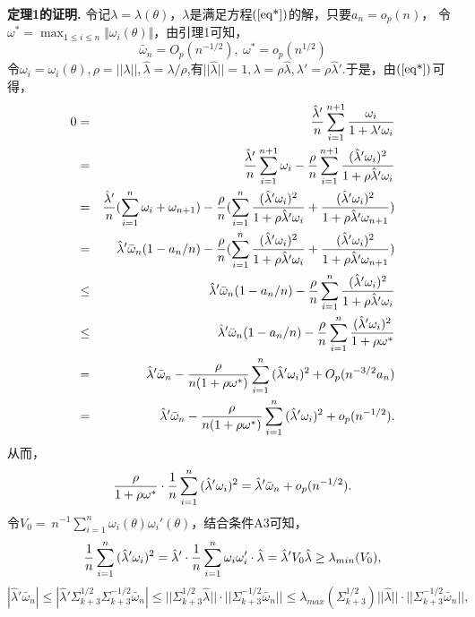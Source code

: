 \documentclass[onecolumn]{ctexart}	%
\begin{document}
{\bf 定理1的证明. }令记$\lambda=\lambda(\theta)$，$\lambda$是满足方程$(\ref{eq*})$的解，只要\( a_n=o_p(n)\)，
令\( \omega^* = \max_{ 1\leq i\leq n} \Vert  \omega_i(\theta) \Vert  \)，由引理1可知，
\[  \bar{\omega}_{n}=O_p(n^{-1/2}),\   \omega^* =o_p(n^{1/2})\]
令$\omega_i=\omega_i(\theta),\rho=||\lambda||,\hat{\lambda}=\lambda/\rho$,有$||\hat{\lambda}||=1,\lambda=\rho\hat{\lambda},\lambda'=\rho\hat{\lambda}'$.于是，由$\rm(\ref{eq*}) $可得，
\begin{eqnarray*}
0 &=&{\hat{\lambda}'\over n}\sum^{n+1}_{i=1}{\omega_i \over 1+\lambda'\omega_i}\\
&=&{\hat{\lambda}'\over n}\sum^{n+1}_{i=1}{\omega_i}-{\rho\over n}\sum^{n+1}_{i=1}{(\hat{\lambda}'\omega_i)^2 \over 1+\rho\hat{\lambda}'\omega_i} \\
&=&{\hat{\lambda}'\over n}(\sum^{n}_{i=1}{\omega_i}+\omega_{n+1})-{\rho\over n}(\sum^{n}_{i=1}{(\hat{\lambda}'\omega_i)^2 \over 1+\rho\hat{\lambda}'\omega_i}+{(\hat{\lambda}'\omega_i)^2 \over 1+\rho\hat{\lambda}'\omega_{n+1}})\\
&=&\hat{\lambda}'\bar{\omega}_n(1-a_n/n)-{\rho\over n}(\sum^{n}_{i=1}{(\hat{\lambda}'\omega_i)^2 \over 1+\rho\hat{\lambda}'\omega_i}+{(\hat{\lambda}'\omega_i)^2 \over 1+\rho\hat{\lambda}'\omega_{n+1}})\\
&\le& \hat{\lambda}'\bar{\omega}_n(1-a_n/n)-{\rho\over n}\sum^{n}_{i=1}{(\hat{\lambda}'\omega_i)^2 \over 1+\rho\hat{\lambda}'\omega_i}\\
&\le& \hat{\lambda}'\bar{\omega}_n(1-a_n/n)-{\rho\over n}\sum^{n}_{i=1}{(\hat{\lambda}'\omega_i)^2 \over 1+\rho\omega^*}\\
&=& \hat{\lambda}'\bar{\omega}_n-{\rho\over n(1+\rho\omega^*)}\sum^{n}_{i=1}{(\hat{\lambda}'\omega_i)^2 }+O_p(n^{-3/2}a_n)\\
&=& \hat{\lambda}'\bar{\omega}_n-{\rho\over n(1+\rho\omega^*)}\sum^{n}_{i=1}{(\hat{\lambda}'\omega_i)^2 }+o_p(n^{-1/2}).
\end{eqnarray*}
从而，
$${\rho\over 1+\rho\omega^*}\cdot {1 \over n}\sum^{n}_{i=1}{(\hat{\lambda}'\omega_i)^2 }= \hat{\lambda}'\bar{\omega}_n+o_p(n^{-1/2}).$$
令$V_0 =\ n^{-1}\sum^{n}_{i=1}{\omega_i(\theta)}{\omega_i'(\theta)}$，结合条件A3可知，
$${1 \over n}\sum^{n}_{i=1}{(\hat{\lambda}'\omega_i)^2 }=\hat{\lambda}'\cdot{1 \over n}\sum^{n}_{i=1}{\omega_i\omega_i'}\cdot\hat{\lambda}=\hat{\lambda}'V_0\hat{\lambda} \ge \lambda_{min} (V_0),$$
 $$
 |\hat{\lambda}'\bar{\omega}_n| \le |\hat{\lambda}'\Sigma_{k+3}^{1/2}\Sigma_{k+3}^{-1/2}\bar{\omega}_n| \le  ||\Sigma_{k+3}^{1/2}\hat{\lambda}|| \cdot ||\Sigma_{k+3}^{-1/2}\bar{\omega}_n|| \le  \lambda_{max} ( \Sigma_{k+3}^{1/2})||\hat{\lambda}|| \cdot ||\Sigma_{k+3}^{-1/2}\bar{\omega}_n||   ,$$
\end{document}
